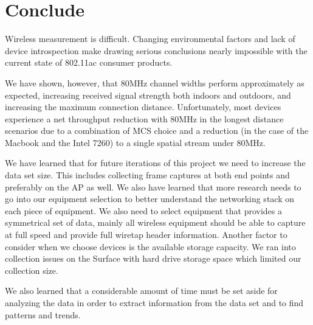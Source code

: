 \section{Conclude}
Wireless measurement is difficult. Changing environmental factors and
lack of device introspection make drawing serious conclusions nearly
impossible with the current state of 802.11ac consumer products.

We have shown, however, that 80MHz channel widths perform
approximately as expected, increasing received signal strength both
indoors and outdoors, and increasing the maximum connection distance.
Unfortunately, most devices experience a net throughput reduction with
80MHz in the longest distance scenarios due to a combination of MCS
choice and a reduction (in the case of the Macbook and the Intel 7260)
to a single spatial stream under 80MHz.

We have learned that for future iterations of this project we need to increase the data set size.
This includes collecting frame captures at both end points and preferably on the AP as well. We also
have learned that more research needs to go into our equipment selection to better understand
the networking stack on each piece of equipment. We also need to select equipment that provides a symmetrical set of data, mainly all wireless equipment should be able to capture at full speed and provide full wiretap header information. Another factor to consider when we choose devices is the available storage capacity. We ran into collection issues on the Surface with hard drive storage space which limited our collection size.

We also learned that a considerable amount of time must be set aside for analyzing the data in order to extract information from the data set and to find patterns and trends.
